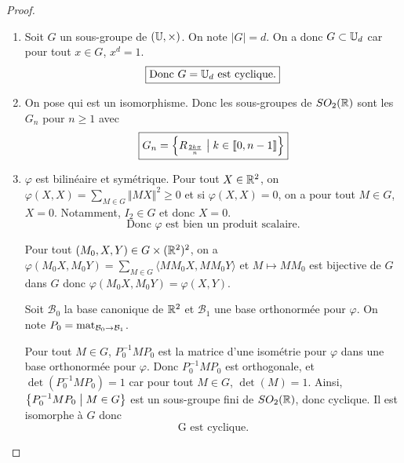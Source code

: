 \documentclass[12pt]{article}
\begin{document}
\begin{proof}
	\phantom{}
	\begin{enumerate}
		\item Soit $G$ un sous-groupe de $(\mathbb{U},\times)$. On note $\vert G\vert=d$. On a donc $G\subset\mathbb{U}_{d}$ car pour tout $x\in G$, $x^{d}=1$. 
		\begin{equation}
			\boxed{\text{Donc }G=\mathbb{U}_{d}\text{ est cyclique.}}
		\end{equation}
		
		\item On pose 
		qui est un isomorphisme. Donc les sous-groupes de $SO_{2}(\mathbb{R})$ sont les $G_{n}$ pour $n\geqslant1$ avec 
		\begin{equation}
			\boxed{
			G_{n}=\left\{R_{\frac{2k\pi}{n}}\bigm| k\in\left\llbracket 0,n-1\right\rrbracket\right\}}
		\end{equation}

		\item $\varphi$ est bilinéaire et symétrique. Pour tout $X\in\mathbb{R}^{2}$, on $\varphi(X,X)=\sum_{M\in G}\Vert MX\Vert^{2}\geqslant0$ et si $\varphi(X,X)=0$, on a pour tout $M\in G$, $X=0$. Notamment, $I_{2}\in G$ et donc $X=0$. 
		\begin{equation}
			\boxed{\text{Donc }\varphi\text{ est bien un produit scalaire.}}
		\end{equation}
		
		Pour tout $(M_{0},X,Y)\in G\times(\mathbb{R}^{2})^{2}$, on a $\varphi(M_{0}X,M_{0}Y)=\sum_{M\in G}\langle MM_{0}X,MM_{0}Y\rangle$
		et $M\mapsto MM_{0}$ est bijective de $G$ dans $G$ donc $\varphi(M_{0}X,M_{0}Y)=\varphi(X,Y)$.

		Soit $\mathcal{B}_{0}$ la base canonique de $\mathbb{R}^{2}$ et $\mathcal{B}_{1}$ une base orthonormée pour $\varphi$. On note $P_{0}=\operatorname{mat}\limits_{\mathcal{B}_{0}\to \mathcal{B}_{1}}$. 
		
		Pour tout $M\in G$, $P_{0}^{-1}MP_{0}$ est la matrice d'une isométrie pour $\varphi$ dans une base orthonormée pour $\varphi$. Donc $P_{0}^{-1}MP_{0}$ est orthogonale, et $\det(P_{0}^{-1}MP_{0})=1$ car pour tout $M\in G$, $\det(M)=1$. Ainsi, $\left\{P_{0}^{-1}MP_{0}\bigm| M\in G\right\}$ est un sous-groupe fini de $SO_{2}(\mathbb{R})$, donc cyclique. Il est isomorphe à $G$ donc 
		\begin{equation}
			\boxed{\text{G est cyclique.}}
		\end{equation}
	\end{enumerate}
\end{proof}
\end{document}
